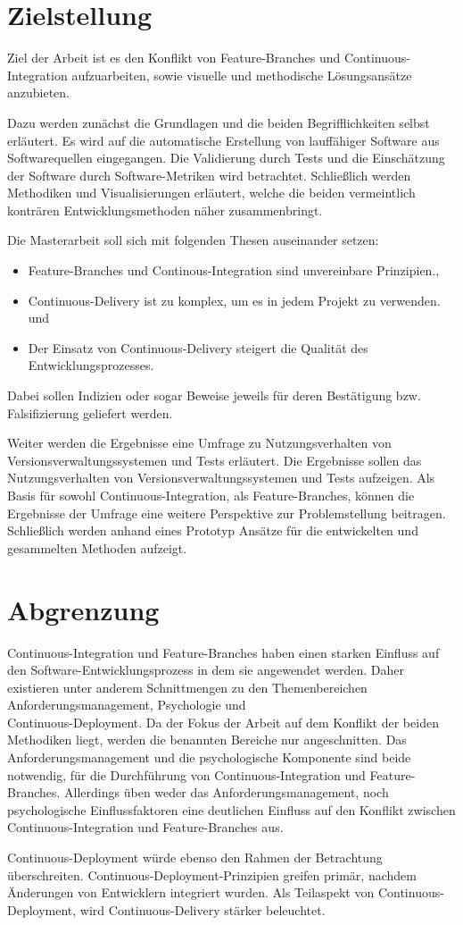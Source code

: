 \section{Zielstellung}

Ziel der Arbeit ist es den Konflikt von \glqq Feature-Branches\grqq{} und \glqq Continuous-Integration\grqq{} aufzuarbeiten, sowie visuelle und methodische Lösungsansätze anzubieten. 

Dazu werden zunächst die Grundlagen und die beiden Begrifflichkeiten selbst erläutert. Es wird auf die automatische Erstellung von lauffähiger Software aus Softwarequellen eingegangen. Die Validierung durch Tests und die Einschätzung der Software durch Software-Metriken wird betrachtet. Schließlich werden Methodiken und Visualisierungen erläutert, welche die beiden vermeintlich konträren Entwicklungsmethoden näher zusammenbringt.

Die Masterarbeit soll sich mit folgenden Thesen auseinander setzen:
\begin{itemize}
\item \glqq Feature-Branches und Continous-Integration sind unvereinbare Prinzipien.\grqq{},
\item \glqq Continuous-Delivery ist zu komplex, um es in jedem Projekt zu verwenden.\grqq{} und
\item \glqq Der Einsatz von Continuous-Delivery steigert die Qualität des Entwicklungsprozesses.\grqq{}
\end{itemize}
Dabei sollen Indizien oder sogar Beweise jeweils für deren Bestätigung bzw. Falsifizierung geliefert werden.

Weiter werden die Ergebnisse eine Umfrage zu \glqq Nutzungsverhalten von Versionsverwaltungssystemen und Tests\grqq{} erläutert. Die Ergebnisse sollen das Nutzungsverhalten von Versionsverwaltungssystemen und Tests aufzeigen. Als Basis für sowohl Continuous-Integration, als Feature-Branches, können die Ergebnisse der Umfrage eine weitere Perspektive zur Problemstellung beitragen. Schließlich werden anhand eines Prototyp Ansätze für die entwickelten und gesammelten Methoden aufzeigt.

\section{Abgrenzung}

Continuous-Integration und Feature-Branches haben einen starken Einfluss auf den Software-Entwicklungsprozess in dem sie angewendet werden. Daher existieren unter anderem Schnittmengen zu den Themenbereichen Anforderungsmanagement, Psychologie und \\Continuous-Deployment. 
Da der Fokus der Arbeit auf dem Konflikt der beiden Methodiken liegt, werden die benannten Bereiche nur angeschnitten. Das Anforderungsmanagement und die psychologische Komponente sind beide notwendig, für die Durchführung von Continuous-Integration und Feature-Branches. Allerdings üben weder das Anforderungsmanagement, noch psychologische Einflussfaktoren eine deutlichen Einfluss auf den Konflikt zwischen Continuous-Integration und Feature-Branches aus. 

Continuous-Deployment würde ebenso den Rahmen der Betrachtung überschreiten. Continuous-Deployment-Prinzipien greifen primär, nachdem Änderungen von Entwicklern integriert wurden. Als Teilaspekt von Continuous-Deployment, wird Continuous-Delivery stärker beleuchtet.